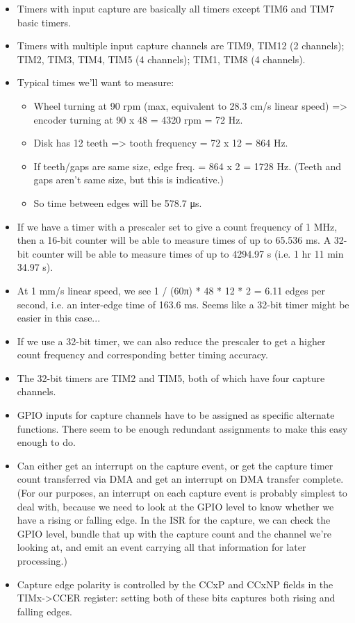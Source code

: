 \documentclass[a4paper,11pt]{article}
\begin{document}
\begin{itemize}
  \item{Timers with input capture are basically all timers except TIM6
    and TIM7 basic timers.}
  \item{Timers with multiple input capture channels are TIM9, TIM12 (2
    channels); TIM2, TIM3, TIM4, TIM5 (4 channels); TIM1, TIM8 (4
    channels).}
  \item{Typical times we'll want to measure:
    \begin{itemize}
      \item{Wheel turning at 90 rpm (max, equivalent to 28.3 cm/s
        linear speed) => encoder turning at 90 x 48 = 4320 rpm = 72
        Hz.}
      \item{Disk has 12 teeth => tooth frequency = 72 x 12 = 864 Hz.}
      \item{If teeth/gaps are same size, edge freq. = 864 x 2 = 1728
        Hz. (Teeth and gaps aren't same size, but this is
        indicative.)}
      \item{So time between edges will be 578.7 μs.}
   \end{itemize}}
  \item{If we have a timer with a prescaler set to give a count
    frequency of 1 MHz, then a 16-bit counter will be able to measure
    times of up to 65.536 ms. A 32-bit counter will be able to measure
    times of up to 4294.97 s (i.e. 1 hr 11 min 34.97 s).}
  \item{At 1 mm/s linear speed, we see 1 / (60π) * 48 * 12 * 2 = 6.11
    edges per second, i.e. an inter-edge time of 163.6 ms. Seems like
    a 32-bit timer might be easier in this case...}
  \item{If we use a 32-bit timer, we can also reduce the prescaler to
    get a higher count frequency and corresponding better timing
    accuracy.}
  \item{The 32-bit timers are TIM2 and TIM5, both of which have four
    capture channels.}
  \item{GPIO inputs for capture channels have to be assigned as
    specific alternate functions. There seem to be enough redundant
    assignments to make this easy enough to do.}
  \item{Can either get an interrupt on the capture event, or get the
    capture timer count transferred via DMA and get an interrupt on
    DMA transfer complete. (For our purposes, an interrupt on each
    capture event is probably simplest to deal with, because we need
    to look at the GPIO level to know whether we have a rising or
    falling edge. In the ISR for the capture, we can check the GPIO
    level, bundle that up with the capture count and the channel we're
    looking at, and emit an event carrying all that information for
    later processing.)}
  \item{Capture edge polarity is controlled by the CCxP and CCxNP
    fields in the TIMx->CCER register: setting both of these bits
    captures both rising and falling edges.}
\end{itemize}
\end{document}
